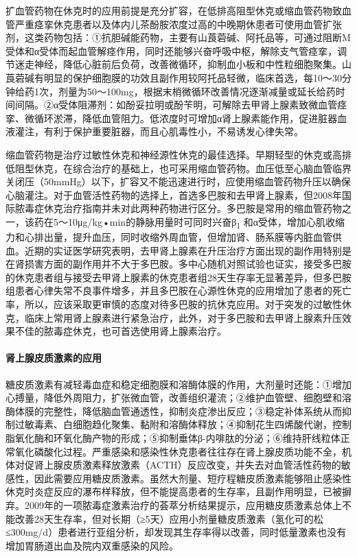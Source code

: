 扩血管药物在休克时的应用前提是充分扩容，在低排高阻型休克或缩血管药物致血管严重痉挛休克患者以及体内儿茶酚胺浓度过高的中晚期休患者可使用血管扩张剂，这类药物包括：①抗胆碱能药物，主要有山莨菪碱、阿托品等，可通过阻断M受体和α受体而起血管解痉作用，同时还能够兴奋呼吸中枢，解除支气管痉挛，调节迷走神经，降低心脏前后负荷，改善微循环，抑制血小板和中性粒细胞聚集。山莨菪碱有明显的保护细胞膜的功效且副作用较阿托品轻微，临床首选，每10～30分钟给药1次，剂量为50～100mg，根据末梢微循环改善情况逐渐减量或延长给药时间间隔。②α受体阻滞剂：如酚妥拉明或酚苄明，可解除去甲肾上腺素致微血管痉挛、微循环淤滞，降低血管阻力。低浓度时可增加α肾上腺素能作用，促进脏器血液灌注，有利于保护重要脏器，而且心肌毒性小，不易诱发心律失常。

缩血管药物是治疗过敏性休克和神经源性休克的最佳选择。早期轻型的休克或高排低阻型休克，在综合治疗的基础上，也可采用缩血管药物。血压低至心脑血管临界关闭压（50mmHg）以下，扩容又不能迅速进行时，应使用缩血管药物升压以确保心脑灌注。对于血管活性药物的选择上，首选多巴胺和去甲肾上腺素，但2008年国际脓毒症休克治疗指南并未对此两种药物进行区分。多巴胺是常用的缩血管药物之一，该药在5～10μg/kg•min的静脉用量时可同时兴奋β\textsubscript{1}
和α受体，增加心肌收缩力和心排出量，提升血压，同时收缩外周血管，但增加肾、肠系膜等内脏血管供血。近期的实证医学研究表明，去甲肾上腺素在升压治疗方面出现的副作用特别是在肾损害方面的副作用并不大于多巴胺。多中心随机对照试验也证实，接受多巴胺的休克患者组与接受去甲肾上腺素的休克患者组28天生存率无显著差异，但多巴胺组患者心律失常不良事件增多，并且多巴胺在心源性休克的应用增加了患者的死亡率，所以，应该采取更审慎的态度对待多巴胺的抗休克应用。对于突发的过敏性休克，临床上常用肾上腺素进行紧急治疗，此外，对于多巴胺和去甲肾上腺素升压效果不佳的脓毒症休克，也可首选使用肾上腺素治疗。

\paragraph{肾上腺皮质激素的应用}

糖皮质激素有减轻毒血症和稳定细胞膜和溶酶体膜的作用，大剂量时还能：①增加心搏量，降低外周阻力，扩张微血管，改善组织灌流；②维护血管壁、细胞壁和溶酶体膜的完整性，降低脑血管通透性，抑制炎症渗出反应；③稳定补体系统从而抑制过敏毒素、白细胞趋化聚集、黏附和溶酶体释放；④抑制花生四烯酸代谢，控制脂氧化酶和环氧化酶产物的形成；⑤抑制垂体β-内啡肽的分泌；⑥维持肝线粒体正常氧化磷酸化过程。严重感染和感染性休克患者往往存在肾上腺皮质功能不全，机体对促肾上腺皮质激素释放激素（ACTH）反应改变，并失去对血管活性药物的敏感性，因此需要应用糖皮质激素。虽然大剂量、短疗程糖皮质激素能够阻止感染性休克时炎症反应的瀑布样释放，但不能提高患者的生存率，且副作用明显，已被摒弃。2009年的一项脓毒症激素治疗的荟萃分析结果提示，应用糖皮质激素总体上不能改善28天生存率，但对长期（≥5天）应用小剂量糖皮质激素（氢化可的松≤300mg/d）患者进行亚组分析，却发现其生存率得以改善，同时低量激素也没有增加胃肠道出血及院内双重感染的风险。

